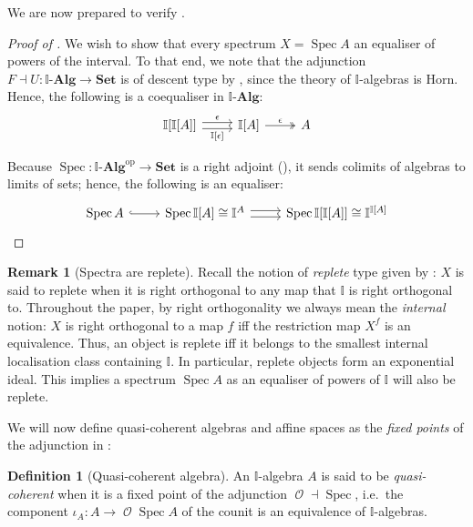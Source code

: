 \documentclass[a4paper,12pt]{amsart}
\theoremstyle{definition}
\newtheorem{definition}[theorem]{Definition}
\newtheorem{remark}[theorem]{Remark}
\newcommand{\mc}[1]{\mathcal{#1}}
\newcommand{\mb}[1]{\mathbf{#1}}
\newcommand{\mbb}[1]{\mathbb{#1}}
\newcommand{\I}{\mbb I}
\newcommand{\Set}{\mb{Set}}
\newcommand{\alg}{\text{-}\mb{Alg}}
\newcommand{\op}{^{\mathrm{op}}}
\newcommand{\spec}{\operatorname{Spec}}
\newcommand{\opens}{\operatorname{\mc{O}}} %
\begin{document}
We are now prepared to verify .

\begin{proof}[Proof of ]
  We wish to show that every spectrum $X=\spec A$ an equaliser of powers of the interval.
  To that end, we note that the adjunction $F\dashv U\colon \I\alg \to\Set$ is of descent type by , since the theory of $\I$-algebras is Horn. Hence, the following is a coequaliser in $\I\alg$: 
  \[
  \begin{tikzcd}
    \I[\I[A]] \ar[r, shift left, "\epsilon"] \ar[r, shift right, "{\I[\epsilon]}"'] & \I[A] \ar[r, two heads, "\epsilon"] & A
  \end{tikzcd}
  \]

  Because $\spec\colon \I\alg\op\to\Set$ is a right adjoint (), it sends colimits of algebras to limits of sets; hence, the following is an equaliser:
  \[
  \begin{tikzcd}
    \spec A \ar[r, hook] & \spec\I[A] \cong \I^A \ar[r, shift left] \ar[r, shift right] & \spec\I[\I[A]]\cong\I^{\I[A]}
  \end{tikzcd}
  \qedhere
  \]
\end{proof}

\begin{remark}[Spectra are replete]\label{rem:specarereplete}
  Recall the notion of \emph{replete} type given by \citet{hyland1990first}: $X$ is said to replete when it is right orthogonal to any map that $\I$ is right orthogonal to. Throughout the paper, by right orthogonality we always mean the \emph{internal} notion: $X$ is right orthogonal to a map $f$ iff the restriction map $X^f$ is an equivalence. Thus, an object is replete iff it belongs to the smallest internal localisation class containing $\I$. In particular, replete objects form an exponential ideal. This implies a spectrum $\spec A$ as an equaliser of powers of $\I$ will also be replete.
\end{remark}

We will now define quasi-coherent algebras and affine spaces as the \emph{fixed points} of the adjunction in :

\begin{definition}[Quasi-coherent algebra]
  An $\I$-algebra $A$ is said to be \emph{quasi-coherent} when it is a fixed point of the adjunction $\opens \dashv \spec$, i.e.\ the component $\iota_A\colon A \to \opens{\spec A}$ of the counit is an equivalence of $\I$-algebras.
\end{definition}
\end{document}
